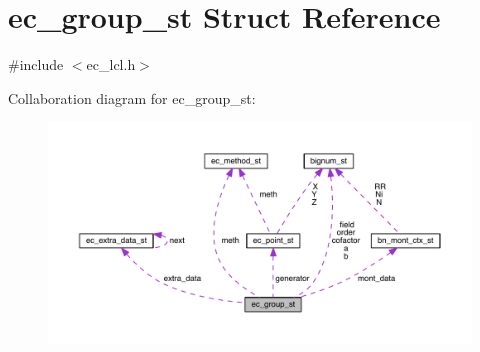 \hypertarget{structec__group__st}{}\section{ec\+\_\+group\+\_\+st Struct Reference}
\label{structec__group__st}


{\ttfamily \#include $<$ec\+\_\+lcl.\+h$>$}



Collaboration diagram for ec\+\_\+group\+\_\+st\+:\nopagebreak
\begin{figure}[H]
\begin{center}
\leavevmode
\includegraphics[width=350pt]{structec__group__st__coll__graph}
\end{center}
\end{figure}
